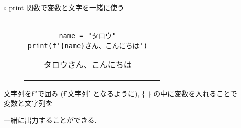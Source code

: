 \documentclass[dvipdfmx]{jsbook}
\newcommand{\info}[2]{\begin{tcolorbox}[colframe=gray, colback=black!10!white, coltitle=white, fonttitle=\bfseries, title={#1}]
{#2}\end{tcolorbox}}
\begin{document}
\begin{itemize}
\begin{itemize}
		      \item[$\circ $] print 関数で変数と文字を一緒に使う
			      \begin{figure}[htp]
				      \begin{tabular}{cc} \hspace{10truemm}
					      \begin{minipage}[ht]{.35\textwidth}
						      \begin{lstlisting}[caption=fフォーマット]
name = "タロウ"
print(f'{name}さん、こんにちは')\end{lstlisting}
					      \end{minipage} \hspace{10truemm}
					      \begin{minipage}[ht]{.4\textwidth}
						      \info{出力}{タロウさん、こんにちは}
					      \end{minipage} \hspace{3truemm}
				      \end{tabular}
			      \end{figure}
			      \info{説明}{文字列をf''で囲み (f'文字列' となるように), \{ \} の中に変数を入れることで変数と文字列を \par 一緒に出力することができる.}
	      \end{itemize}
\end{itemize}

\newpage
\end{document}
